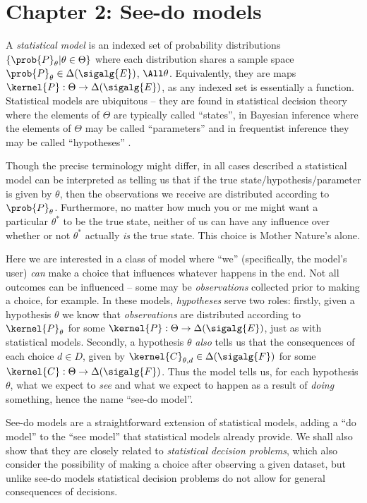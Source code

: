 

\chapter{Chapter 2: See-do models}

A \emph{statistical model} is an indexed set of probability distributions $\{\prob{P}_\theta|\theta\in \Theta\}$ where each distribution shares a sample space $\prob{P}_\theta\in \Delta(\sigalg{E})$, $\All \theta$. Equivalently, they are maps $\kernel{P}:\Theta\to \Delta(\sigalg{E})$, as any indexed set is essentially a function. Statistical models are ubiquitous -- they are found in statistical decision theory where the elements of $\Theta$ are typically called ``states''\citep{wald_statistical_1950}, in Bayesian inference where the elements of $\Theta$ may be called ``parameters'' \citep{freedman_asymptotic_1963} and in frequentist inference they may be called ``hypotheses'' \citep{fisher_statistical_1992}. 

Though the precise terminology might differ, in all cases described a statistical model can be interpreted as telling us that if the true state/hypothesis/parameter is given by $\theta$, then the observations we receive are distributed according to $\prob{P}_\theta$. Furthermore, no matter how much you or me might want a particular $\theta^*$ to be the true state, neither of us can have any influence over whether or not $\theta^*$ actually \emph{is} the true state. This choice is Mother Nature's alone.

Here we are interested in a class of model where ``we'' (specifically, the model's user) \emph{can} make a choice that influences whatever happens in the end. Not all outcomes can be influenced -- some may be \emph{observations} collected prior to making a choice, for example. In these models, \emph{hypotheses} serve two roles: firstly, given a hypothesis $\theta$ we know that \emph{observations} are distributed according to $\kernel{P}_\theta$ for some $\kernel{P}:\Theta\to \Delta(\sigalg{E})$, just as with statistical models. Secondly, a hypothesis $\theta$ \emph{also} tells us that the consequences of each choice $d\in D$, given by $\kernel{C}_{\theta,d}\in \Delta(\sigalg{F})$ for some $\kernel{C}:\Theta\to \Delta(\sigalg{F})$. Thus the model tells us, for each hypothesis $\theta$, what we expect to \emph{see} and what we expect to happen as a result of \emph{doing} something, hence the name ``see-do model''.

See-do models are a straightforward extension of statistical models, adding a ``do model'' to the ``see model'' that statistical models already provide. We shall also show that they are closely related to \emph{statistical decision problems}, which also consider the possibility of making a choice after observing a given dataset, but unlike see-do models statistical decision problems do not allow for general consequences of decisions.

